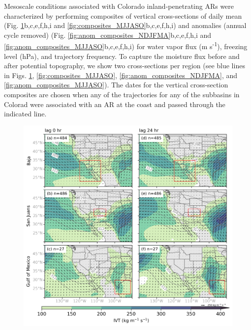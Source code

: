 \documentclass[draft]{agujournal2019}
\begin{document}
Mesoscale conditions associated with Colorado inland-penetrating ARs were characterized by performing composites of vertical cross-sections of daily mean (Fig. \ref{fig:composites_NDJFMA}b,c,e,f,h,i and \ref{fig:composites_MJJASO}b,c,e,f,h,i) and anomalies (annual cycle removed) (Fig. \ref{fig:anom_composites_NDJFMA}b,c,e,f,h,i and \ref{fig:anom_composites_MJJASO}b,c,e,f,h,i) for water vapor flux (m s\textsuperscript{-1}), freezing level (hPa), and trajectory frequency. To capture the moisture flux before and after potential topography, we show two cross-sections per region (see blue lines in Figs. \ref{fig:composites_NDJFMA}, \ref{fig:composites_MJJASO}, \ref{fig:anom_composites_NDJFMA}, and \ref{fig:anom_composites_MJJASO}). The dates for the vertical cross-section composites are chosen when any of the trajectories for any of the subbasins in Colorad were associated with an AR at the coast and passed through the indicated line. 

\begin{figure}
\noindent\includegraphics[width=\textwidth]{fig7.png}
\label{fig:composites_NDJFMA}
\caption{}
\end{figure}
\end{document}
